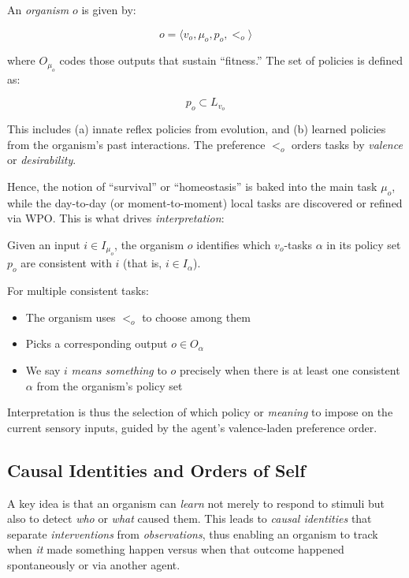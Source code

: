 \documentclass[12pt]{article}
\begin{document}
\begin{definition}[Organism]
An \textit{organism} $o$ is given by:

\[
   o = \langle v_o, \mu_o, p_o, <_o \rangle
\]

where $O_{\mu_o}$ codes those outputs that sustain ``fitness.'' The set of policies is defined as:

\[
   p_o \subset L_{v_o}
\]

This includes (a) innate reflex policies from evolution, and (b) learned policies from the organism's past interactions. The preference $<_o$ orders tasks by \textit{valence} or \textit{desirability}.
\end{definition}

Hence, the notion of ``survival'' or ``homeostasis'' is baked into the main task $\mu_o$, while the day-to-day (or moment-to-moment) local tasks are discovered or refined via WPO. This is what drives \textit{interpretation}:

\begin{definition}[Interpretation]
Given an input $i \in I_{\mu_o}$, the organism $o$ identifies which $v_o$-tasks $\alpha$ in its policy set $p_o$ are consistent with $i$ (that is, $i \in I_{\alpha}$). 

For multiple consistent tasks:
\begin{itemize}
\item The organism uses $<_o$ to choose among them
\item Picks a corresponding output $o \in O_{\alpha}$
\item We say $i$ \textit{means something} to $o$ precisely when there is at least one consistent $\alpha$ from the organism's policy set
\end{itemize}
\end{definition}

Interpretation is thus the selection of which policy or \textit{meaning} to impose on the current sensory inputs, guided by the agent's valence-laden preference order.

\subsection{Causal Identities and Orders of Self}

A key idea is that an organism can \textit{learn} not merely to respond to stimuli but also to detect \textit{who} or \textit{what} caused them. This leads to \textit{causal identities} that separate \textit{interventions} from \textit{observations}, thus enabling an organism to track when \textit{it} made something happen versus when that outcome happened spontaneously or via another agent.
\end{document}
